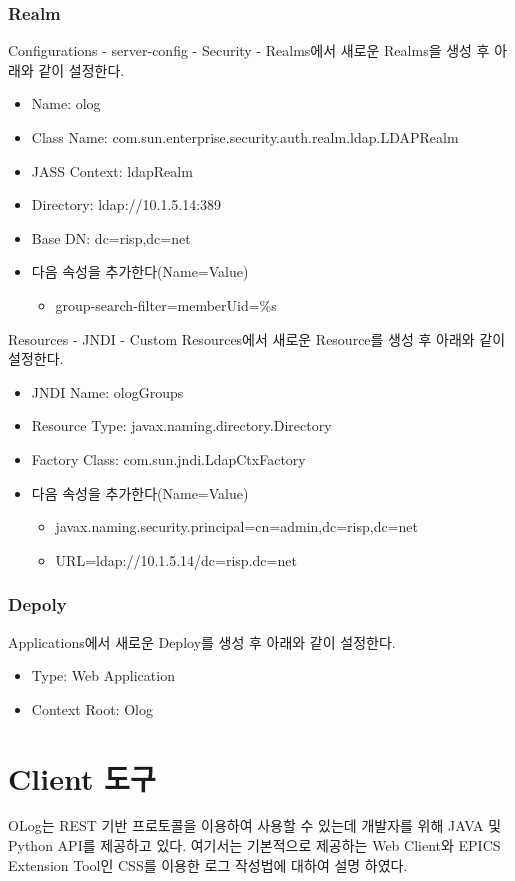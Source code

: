 \documentclass[11pt
  , a4paper
  , article
  , oneside
]{memoir}
\begin{document}
\subsection{Realm}
Configurations - server-config - Security - Realms에서 새로운 Realms을 생성 후 
아래와 같이 설정한다.
\begin{itemize}
\item Name: olog
\item Class Name: com.sun.enterprise.security.auth.realm.ldap.LDAPRealm
\item JASS Context: ldapRealm
\item Directory: ldap://10.1.5.14:389
\item Base DN: dc=risp,dc=net
\item 다음 속성을 추가한다(Name=Value)
  \begin{itemize}
  \item group-search-filter=memberUid=\%s
  \end{itemize}
\end{itemize}
Resources - JNDI - Custom Resources에서 새로운 Resource를 생성 후
아래와 같이 설정한다.
\begin{itemize}
\item JNDI Name: ologGroups
\item Resource Type: javax.naming.directory.Directory
\item Factory Class: com.sun.jndi.LdapCtxFactory
\item 다음 속성을 추가한다(Name=Value)
  \begin{itemize}
  \item javax.naming.security.principal=cn=admin,dc=risp,dc=net
  \item URL=ldap://10.1.5.14/dc=risp.dc=net
  \end{itemize}
\end{itemize}

\subsection{Depoly}
Applications에서 새로운 Deploy를 생성 후 아래와 같이 설정한다.
\begin{itemize}
\item Type: Web Application
\item Context Root: Olog
\end{itemize}

\chapter{Client 도구}
OLog는 REST 기반 프로토콜을 이용하여 사용할 수 있는데 개발자를 위해
JAVA 및 Python API를 제공하고 있다.\citep{OLOG_DN} 여기서는 기본적으로 제공하는
Web Client와  EPICS Extension Tool인 CSS를 이용한 로그 작성법에 대하여 설명 하였다.
\end{document}
